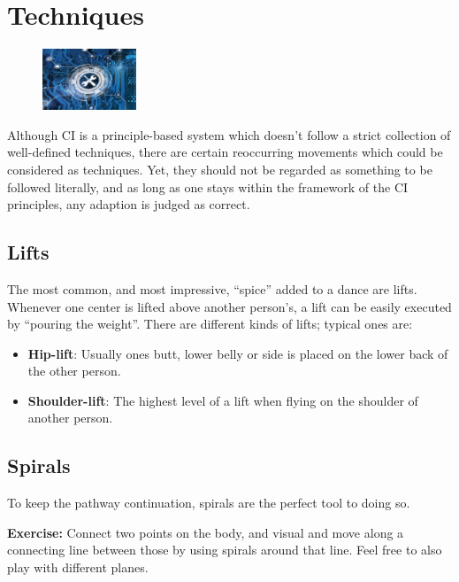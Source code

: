 \section{Techniques}\label{sec:techniques}

\begin{figure}
    \centering
    \includegraphics[width=0.25\textwidth]{images/techniques}
\end{figure}

Although CI is a principle-based system which doesn't follow a strict collection of well-defined techniques, there are certain reoccurring movements which could be considered as techniques.
Yet, they should not be regarded as something to be followed literally, and as long as one stays within the framework of the CI principles, any adaption is judged as correct.

\subsection{Lifts}\label{subsec:lifts}

The most common, and most impressive, ``spice'' added to a dance are lifts.
Whenever one center is lifted above another person's, a lift can be easily executed by ``pouring the weight''.
There are different kinds of lifts; typical ones are:

\begin{itemize}
    \item \textbf{Hip-lift}: Usually ones butt, lower belly or side is placed on the lower back of the other person.
    \item \textbf{Shoulder-lift}: The highest level of a lift when flying on the shoulder of another person.
\end{itemize}

\subsection{Spirals}\label{subsec:spirals}

To keep the pathway continuation, spirals are the perfect tool to doing so.

\textbf{Exercise:} Connect two points on the body, and visual and move along a connecting line between those by using spirals around that line.
Feel free to also play with different planes.

